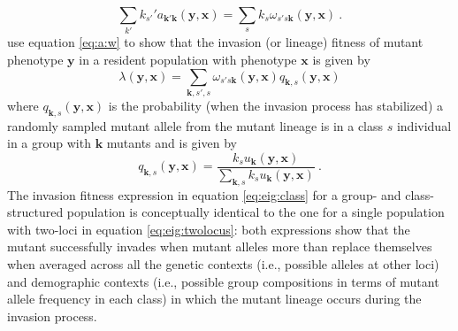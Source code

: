 \documentclass[11pt]{article}
\renewcommand{\vec}[1]{\symbf{#1}}
\newcommand{\eig}{\lambda}
\begin{document}
\begin{equation}
  \label{eq:a:w}
  \sum_{k'} k_{s'}' a_{\vec{k}'\vec{k}}(\vec{y}, \vec{x}) = \sum_{s} k_{s} \omega_{s'\!s\vec{k}}(\vec{y}, \vec{x}) \: .
\end{equation}
\citeauthor{Lehmann:Mullon:2016} \cite{Lehmann:Mullon:2016,Lehmann:Rousset:2020} use equation \eqref{eq:a:w} to show that the invasion (or lineage) fitness of mutant phenotype $\vec{y}$ in a resident population with phenotype $\vec{x}$ is given by
\begin{equation}
  \label{eq:eig:class}
  \eig(\vec{y}, \vec{x}) = \sum_{\vec{k},s'\!,s} \omega_{s'\!s\vec{k}}(\vec{y}, \vec{x}) q_{\vec{k},s}(\vec{y}, \vec{x})
\end{equation}
where $q_{\vec{k},s}(\vec{y}, \vec{x})$ is the probability (when the invasion process has stabilized) a randomly sampled mutant allele from the mutant lineage is in a class $s$ individual in a group with $\vec{k}$ mutants and is given by
\begin{equation*}
  q_{\vec{k},s}(\vec{y}, \vec{x}) = \frac{k_{s} u_{\vec{k}}(\vec{y}, \vec{x})}{\sum_{\vec{k},s} k_{s} u_{\vec{k}}(\vec{y}, \vec{x})} \: .
\end{equation*}
The invasion fitness expression in equation \eqref{eq:eig:class} for a group- and class-structured population is conceptually identical to the one for a single population with two-loci in equation \eqref{eq:eig:twolocus}: both expressions show that the mutant successfully invades when mutant alleles more than replace themselves when averaged across all the genetic contexts (i.e., possible alleles at other loci) and demographic contexts (i.e., possible group compositions in terms of mutant allele frequency in each class) in which the mutant lineage occurs during the invasion process.
\end{document}
